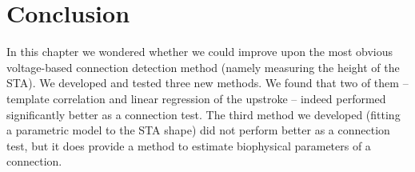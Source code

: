 















\section{Conclusion}

In this chapter we wondered whether we could improve upon the most obvious voltage-based connection detection method (namely measuring the height of the STA). We developed and tested three new methods. We found that two of them -- template correlation and linear regression of the upstroke -- indeed performed significantly better as a connection test. The third method we developed (fitting a parametric model to the STA shape) did not perform better as a connection test, but it does provide a method to estimate biophysical parameters of a connection.
